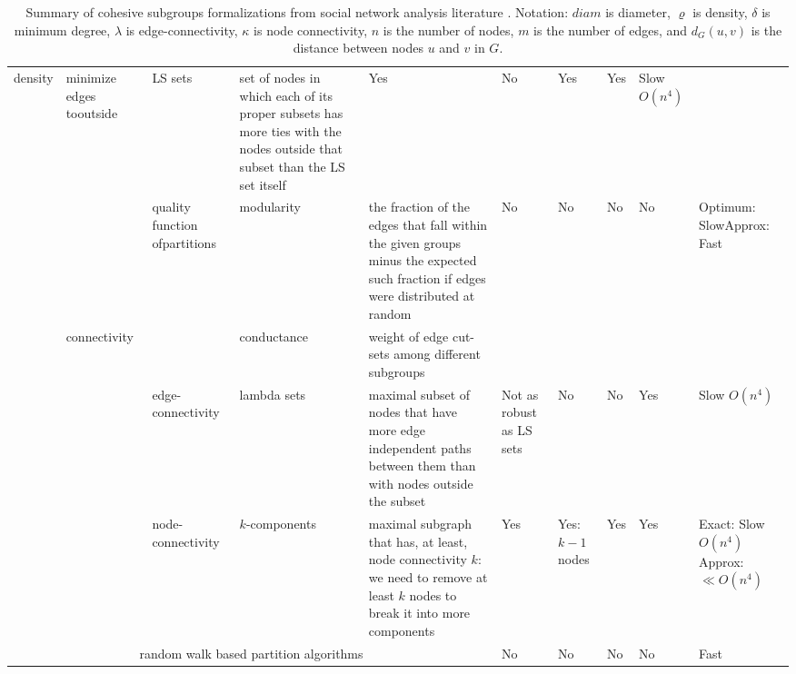 \begin{table}
\begin{footnotesize}
\begin{tabular}{|c|p{1.7cm}|p{2.7cm}|p{2cm}|p{6cm}|p{1.7cm}|p{1.7cm}|p{1.7cm}|p{1.7cm}|p{2.7cm}|}
    \multirow{2}{*}{density}
        &minimize edges to\newline outside&LS sets&set of nodes in which each of its proper subsets
        has more ties with the nodes outside that subset than the LS set itself
        &Yes&No&Yes&Yes&Slow $O(n^4)$\\
        \cline{3-10}
        &&quality function of\newline partitions&modularity&the fraction of the edges that fall within
        the given groups minus the expected such fraction if edges were distributed at random
        &No&No&No&No&Optimum: Slow\newline Approx: Fast\\
        \cline{2-2} \cline{4-5}
    &\multirow{3}{*}{connectivity}
        &&conductance&weight of edge cut-sets among different subgroups&&&&& \\
        \cline{3-10}
        &&edge-connectivity&lambda sets&maximal subset of nodes that have more edge
        independent paths between them than with nodes outside the subset&Not as robust as LS sets&No&No&Yes
        &Slow $O(n^4)$\\
        \cline{3-10}
        &&node-connectivity&$k$-components&maximal subgraph that has, at least, node connectivity $k$:
        we need to remove at least $k$ nodes to break it into more components&Yes&Yes: $k-1$ nodes&Yes
        &Yes&Exact: Slow $O(n^4)$\newline Approx: $\ll O(n^4)$\\
\hline
\hline
\multicolumn{5}{|c|}{random walk based partition algorithms}&No&No&No&No&Fast\\
\hline
\end{tabular}
\end{footnotesize}
\caption[Summary of cohesive subgroups formalizations.]{Summary of cohesive subgroups formalizations from social network analysis literature \citep{luce:1949,luccio:1969,lawler:1973,seidman:1978,mokken:1979,seidman:1983,seidman:1983ls,borgatti:1990,wasserman:1994,white:2001,moody:2003,brandes:2005,fortunato:2010}. Notation: $diam$ is diameter, $\varrho$ is density, $\delta$ is minimum degree, $\lambda$ is edge-connectivity, $\kappa$ is node connectivity, $n$ is the number of nodes, $m$ is the number of edges, and $d_{G}(u,v)$ is the distance between nodes $u$ and $v$ in $G$.}
\label{t:cohesive}
\end{table}
